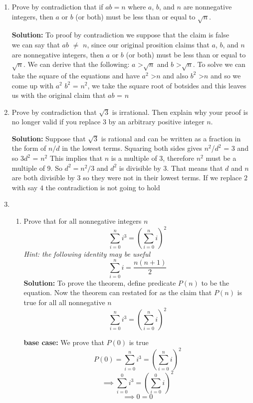 \documentclass[12pt]{article}
\begin{document}
\begin{enumerate}
    \item Prove by contradiction that if $ab = n$ where $a$, $b$, and $n$ are nonnegative integers, then $a$ or $b$ (or both) must be less than or equal to $\sqrt{n}$.

        \textbf{Solution: } To proof by contradiction we suppose that the claim is false 
        \\ we can say that  $ab$ $\neq$ $n$, since our original prosition claims that $a$, $b$, and $n$ are nonnegative integers, then $a$ or $b$ (or both) must be less than or equal to $\sqrt{n}$. We can derive that the following: $a$ \textgreater $\sqrt{n}$ and $b$ \textgreater $\sqrt{n}$. To solve we can take the square of the equations and have ${a}^{2}$ \textgreater $n$ and also ${b}^{2}$ \textgreater $n$ and so we come up with ${a}^{2}$ ${b}^{2}$ = ${n}^{2}$, we take the square root of botsides and this leaves us with the original claim that $ab$ = $n$

    \item Prove by contradiction that $\sqrt{3}$ is irrational. Then explain why your proof is no longer valid if you replace 3 by an arbitrary positive integer $n$.


        \textbf{Solution: } Suppose that $\sqrt{3}$ is rational and can be written as a fraction in the form of $n/d$ in the lowest terms. Squaring both sides gives ${n}^{2}$/${d}^{2}$ = 3 and so $3{d}^{2}$ = ${n}^{2}$ This implies that $n$ is a multiple of 3, therefore ${n}^{2}$ must be a multiple of 9. So $d^2 = n^2/3$ and $d^2$ is divisible by 3. That means that $d$ and $n$ are both divisible by 3 so they were not in their lowest terms. If we replace $2$ with say $4$ the contradiction is not going to hold

    \item \begin{enumerate}

            \item  Prove that for all nonnegative integers $n$
                \[ \sum_{i=0}^{n}i^{3}=\left( \sum_{i=0}^{n}i \right)^{2} \]
                {\em Hint: the following identity may be useful}
                \[ \sum_{i=0}^ni=\frac{n(n+1)}{2} \]
                \textbf{Solution: }
                To prove the theorem, define predicate $P(n)$ to be the equation. Now the theorem can restated for as the claim that $P(n)$ is true for all all nonnegative $n$ 
                \[ \sum_{i=0}^{n}i^{3}=\left( \sum_{i=0}^{n}i \right)^{2} \]

                \textbf{base case: } We prove that $P(0)$ is true
                \[P(0) = \sum_{i=0}^{n}i^{3}=\left( \sum_{i=0}^{n}i \right)^{2} \]
                \[ \implies \sum_{i=0}^{0}i^{3}=\left( \sum_{i=0}^{0}i \right)^{2} \]
                \[ \implies 0 = 0 \]


\end{enumerate}
\end{enumerate}
\end{document}
